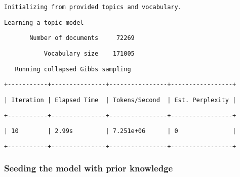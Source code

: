 \documentclass[11pt]{ctexart}
\begin{document}
    
    \begin{verbatim}
Initializing from provided topics and vocabulary.
    \end{verbatim}

    
    
    \begin{verbatim}
Learning a topic model
    \end{verbatim}

    
    
    \begin{verbatim}
       Number of documents     72269
    \end{verbatim}

    
    
    \begin{verbatim}
           Vocabulary size    171005
    \end{verbatim}

    
    
    \begin{verbatim}
   Running collapsed Gibbs sampling
    \end{verbatim}

    
    
    \begin{verbatim}
+-----------+---------------+----------------+-----------------+
    \end{verbatim}

    
    
    \begin{verbatim}
| Iteration | Elapsed Time  | Tokens/Second  | Est. Perplexity |
    \end{verbatim}

    
    
    \begin{verbatim}
+-----------+---------------+----------------+-----------------+
    \end{verbatim}

    
    
    \begin{verbatim}
| 10        | 2.99s         | 7.251e+06      | 0               |
    \end{verbatim}

    
    
    \begin{verbatim}
+-----------+---------------+----------------+-----------------+
    \end{verbatim}

    
    \hypertarget{seeding-the-model-with-prior-knowledge}{%
\subsubsection{Seeding the model with prior
knowledge}\label{seeding-the-model-with-prior-knowledge}}
\end{document}
